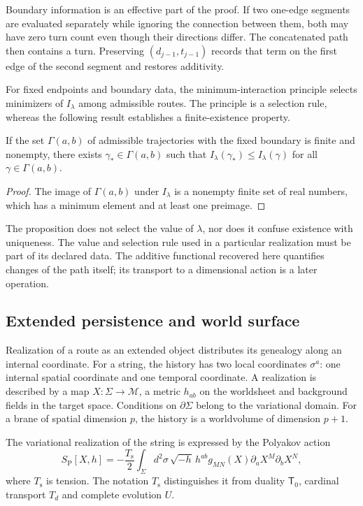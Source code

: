 Boundary information is an effective part of the proof.
If two one-edge segments are evaluated separately
while ignoring the connection between them, both may have zero
turn count even though their directions differ. The
concatenated path then contains a turn. Preserving
\((d_{j-1},t_{j-1})\) records that term on the first
edge of the second segment and restores additivity.

For fixed endpoints and boundary data, the
minimum-interaction principle selects minimizers of
\(I_\lambda\) among admissible routes. The principle
is a selection rule, whereas the following
result establishes a finite-existence property.

\begin{proposition}
If the set \(\Gamma(a,b)\) of admissible trajectories
with the fixed boundary is finite and nonempty, there exists
\(\gamma_*\in\Gamma(a,b)\) such that
\(I_\lambda(\gamma_*)\leq I_\lambda(\gamma)\)
for all \(\gamma\in\Gamma(a,b)\).
\end{proposition}
\begin{proof}
The image of \(\Gamma(a,b)\) under \(I_\lambda\) is
a nonempty finite set of real numbers, which has
a minimum element and at least one preimage.
\end{proof}

The proposition does not select the value of \(\lambda\),
nor does it confuse existence with uniqueness. The value and
selection rule used in a particular realization
must be part of its declared data. The additive
functional recovered here quantifies changes of the path
itself; its transport to a dimensional action is
a later operation.

\subsection{Extended persistence and world surface}

Realization of a route as an extended object distributes
its genealogy along an internal coordinate. For a string,
the history has two local coordinates \(\sigma^a\):
one internal spatial coordinate and one temporal coordinate. A realization is
described by a map \(X:\Sigma\to\mathcal M\), a
metric \(h_{ab}\) on the worldsheet and background
fields in the target space. Conditions on
\(\partial\Sigma\) belong to the variational domain.
For a brane of spatial dimension \(p\), the history
is a worldvolume of dimension \(p+1\).

The variational realization of the string is expressed by
the Polyakov action
\begin{equation}
 S_{\mathrm P}[X,h]
 =-\frac{T_{\mathrm s}}2\int_\Sigma d^2\sigma\,
 \sqrt{-h}\,h^{ab}g_{MN}(X)
             \partial_aX^M\partial_bX^N,
 \label{iv:iv:eq:polyakov}
\end{equation}
where \(T_{\mathrm s}\) is tension. The notation
\(T_{\mathrm s}\) distinguishes it from duality
\(\mathsf T_0\), cardinal transport \(T_d\)
and complete evolution \(U\).

